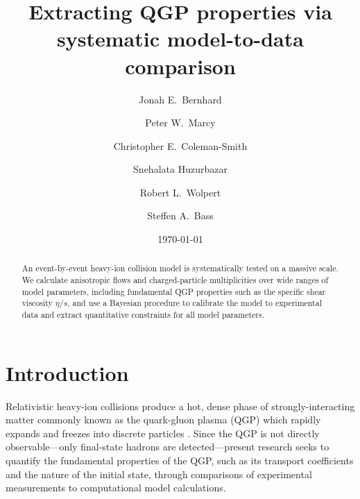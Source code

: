 \documentclass[aps,prc,reprint,superscriptaddress,amsmath]{revtex4-1}
\begin{document}
\title{Extracting QGP properties via systematic model-to-data comparison}

\author{Jonah E.\ Bernhard}

\author{Peter W.\ Marcy}

\author{Christopher E.\ Coleman-Smith}

\author{Snehalata Huzurbazar}

\author{Robert L.\ Wolpert}

\author{Steffen A.\ Bass}

\date{\today}

\begin{abstract}
  An event-by-event heavy-ion collision model is systematically tested on a massive scale.
  We calculate anisotropic flows and charged-particle multiplicities over wide ranges of model parameters, including fundamental QGP properties such as the specific shear viscosity $\eta/s$, and use a Bayesian procedure to calibrate the model to experimental data and extract quantitative constraints for all model parameters.
\end{abstract}

\maketitle


\section{Introduction}

Relativistic heavy-ion collisions produce a hot, dense phase of strongly-interacting matter commonly known as the quark-gluon plasma (QGP) which rapidly expands and freezes into discrete particles \cite{Arsene:2004fa,Adcox:2004mh,Back:2004je,Adams:2005dq,Gyulassy:2004zy,Muller:2006ee,Muller:2012zq}.
Since the QGP is not directly observable---only final-state hadrons are detected---present research seeks to quantify the fundamental properties of the QGP, such as its transport coefficients and the nature of the initial state, through comparisons of experimental measurements to computational model calculations.
\end{document}
